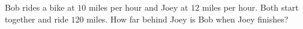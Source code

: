 Bob rides a bike at $10$ miles per hour and Joey at $12$ miles per hour. Both start together and ride $120$ miles. How far behind Joey is Bob when Joey finishes?
